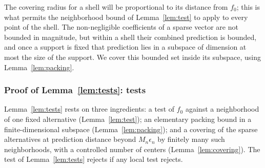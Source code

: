 The covering radius for a shell will be proportional to its distance from $f_0$; this is what permits the neighborhood bound of Lemma~\ref{lem:test} to apply to every point of the shell. The non-negligible coefficients of a sparse vector are not bounded in magnitude, but within a shell their combined prediction is bounded, and once a support is fixed that prediction lies in a subspace of dimension at most the size of the support. We cover this bounded set inside its subspace, using Lemma~\ref{lem:packing}.

\subsubsection*{Proof of Lemma~\ref{lem:tests}: tests}

Lemma~\ref{lem:tests} rests on three ingredients: a test of $f_0$ against a neighborhood of one fixed alternative (Lemma~\ref{lem:test}); an elementary packing bound in a finite-dimensional subspace (Lemma~\ref{lem:packing}); and a covering of the sparse alternatives at prediction distance beyond $M_n\epsilon_n$ by finitely many such neighborhoods, with a controlled number of centers (Lemma~\ref{lem:covering}). The test of Lemma~\ref{lem:tests} rejects if any local test rejects.

